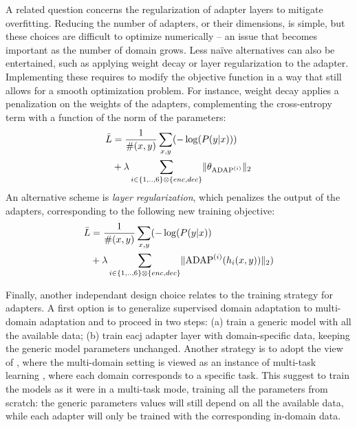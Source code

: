 \documentclass[11pt,a4paper]{article}
\newcommand{\fyDone}[1]{\done[FY]\Todo[FY:]{\textcolor{orange}{#1}}}
\begin{document}
A related question concerns the regularization of adapter layers to mitigate overfitting. Reducing the number of adapters, or their dimensions, is simple, but these choices are difficult to optimize numerically -- an issue that becomes important as the number of domain grows. Less naïve alternatives can also be entertained, such as applying weight decay or layer regularization to the adapter. Implementing these requires to modify the objective function in a way that still allows for a smooth optimization problem. For instance, weight decay applies a penalization on the weights of the adapters, complementing the cross-entropy term with a function of the norm of the parameters: \fyDone{The second summation also runs over $x,y$ ? I think not}
\begin{equation*}
  \begin{split}
    \bar{L} & = \frac{1}{\#(x,y)}\mathop{\sum}_{x,y}( - \log(P(y|x))) \\
    & + \lambda  \sum_{i \in \{1,..,6\} \otimes \{enc, dec\}} \normL{\theta_{\operatorname{ADAP}^{(i)}}}
  \end{split}
\end{equation*}
An alternative scheme is \emph{layer regularization}, which penalizes the output of the adapters, corresponding to the following new training objective:
\begin{equation*}
  \begin{split}
    \bar{L} & = \frac{1}{\#(x,y)}\mathop{\sum}_{x,y} (-\log(P(y|x)) \\
    & + \lambda \sum_{i \in \{1,..,6\} \otimes \{enc, dec\}} \normL{\operatorname{ADAP}^{(i)}(h_i(x,y))})
  \end{split}
\end{equation*}

Finally, another independant design choice relates to the training strategy for adapters. A first option is to generalize supervised domain adaptation to multi-domain adaptation and to proceed in two steps: (a) train a generic model with all the available data; (b) train eacj adapter layer with domain-specific data, keeping the generic model parameters unchanged. Another strategy is to adopt the view of \citet{Dredze08online}, where the multi-domain setting is viewed as an instance of multi-task learning \cite{Caruana97multitask}, where each domain corresponds to a specific task. This suggest to train the models as it were in a multi-task mode, training all the parameters from scratch: the generic parameters values will still depend on all the available data, while each adapter will only be trained with the corresponding in-domain data.
\end{document}
